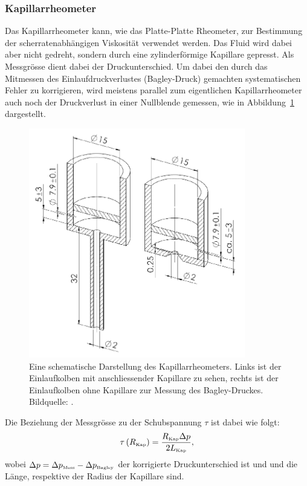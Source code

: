 \subsubsection{Kapillarrheometer}
Das Kapillarrheometer kann, wie das Platte-Platte Rheometer, zur Bestimmung der scherratenabhängigen Viskosität verwendet werden. Das Fluid wird dabei aber nicht gedreht, sondern durch eine zylinderförmige Ka\-pil\-la\-re gepresst. Als Messgrösse dient dabei der Druckunterschied.
Um dabei den durch das Mitmessen des Einlaufdruckverlustes (Bagley-Druck) gemachten systematischen Fehler zu korrigieren, wird meistens parallel zum eigentlichen Kapillarrheometer auch noch der Druckverlust in einer Nullblende gemessen, wie in Abbildung~\ref{fig:kapRheo} dargestellt.
\begin{figure}[tbh]
    \centering
    \includegraphics[height=10cm]{figures/KapRheo.png}
    \caption{Eine schematische Darstellung des Kapillarrheometers. Links ist der Einlaufkolben mit anschliessender Kapillare zu sehen, rechts ist der Einlaufkolben ohne Ka\-pil\-la\-re zur Messung des Bagley-Druckes.\\
    Bildquelle: \cite{Marco}.}
    \label{fig:kapRheo}
\end{figure}

Die Beziehung der Messgrösse  zu der Schubspannung $\tau$ ist dabei wie folgt:
\begin{equation}
    \label{eq:KapRheoTau}
    \tau\left( R_{\mbox{\tiny Kap}} \right) = \frac{R_{\mbox{\tiny Kap}} \Delta p}{2L_\text{\tiny Kap}},
\end{equation}
wobei $\Delta p = \Delta p_{\mbox{\tiny Mess}} -\Delta p_{\mbox{\tiny Bagley}}$ der korrigierte Druckunterschied ist und  und  die Länge, respektive der Radius der Kapillare sind.

